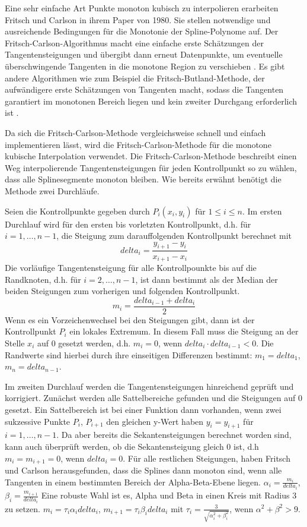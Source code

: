 Eine sehr einfache Art Punkte monoton kubisch zu interpolieren erarbeiten Fritsch und Carlson in ihrem Paper von 1980. Sie stellen notwendige und ausreichende Bedingungen für die Monotonie der Spline-Polynome auf. Der Fritsch-Carlson-Algorithmus macht eine einfache erste Schätzungen der Tangentensteigungen und übergibt dann erneut Datenpunkte, um eventuelle überschwingende Tangenten in die monotone Region zu verschieben \cite{Fritschcarlson:1980}. Es gibt andere Algorithmen wie zum Beispiel die Fritsch-Butland-Methode, der aufwändigere erste Schätzungen von Tangenten macht, sodass die Tangenten garantiert im monotonen Bereich liegen und kein zweiter Durchgang erforderlich ist \cite{Fritschbutland:1984}.

Da sich die Fritsch-Carlson-Methode vergleichsweise schnell und einfach implementieren lässt, wird die Fritsch-Carlson-Methode für die monotone kubische Interpolation verwendet. Die Fritsch-Carlson-Methode beschreibt einen Weg interpolierende Tangentensteigungen für jeden Kontrollpunkt so zu wählen, dass alle Splinesegmente monoton bleiben. Wie bereits erwähnt benötigt die Methode zwei Durchläufe. 

Seien die Kontrollpunkte gegeben durch $P_i(x_i,y_i)$ für $1\le i \le n$.
Im ersten Durchlauf wird für den ersten bis vorletzten Kontrollpunkt, d.h. für $i=1,\dots,n-1$, die Steigung zum darauffolgenden Kontrollpunkt berechnet mit 
$$delta_i=\frac{y_{i+1}-y_i}{x_{i+1}-x_i}$$
Die vorläufige Tangentensteigung für alle Kontrollpounkte bis auf die Randknoten, d.h. für $i=2,\dots,n-1$, ist dann bestimmt als der Median der beiden Steigungen zum vorherigen und folgenden Kontrollpunkt.
$$m_i=\frac{delta_{i-1}+delta_i}{2}$$
Wenn es ein Vorzeichenwechsel bei den Steigungen gibt, dann ist der Kontrollpunkt $P_i$ ein lokales Extremum. In diesem Fall muss die Steigung an der Stelle $x_i$ auf $0$ gesetzt werden, d.h.
$m_i=0$, wenn $delta_i\cdot delta_{i-1} < 0$.
Die Randwerte sind hierbei durch ihre einseitigen Differenzen bestimmt:
$m_1=delta_1$, $m_{n}=delta_{n-1}$.

Im zweiten Durchlauf werden die Tangentensteigungen hinreichend geprüft und korrigiert. Zunächst werden alle Sattelbereiche gefunden und die Steigungen auf $0$ gesetzt. Ein Sattelbereich ist bei einer Funktion dann vorhanden, wenn zwei sukzessive Punkte $P_i$, $P_{i+1}$ den gleichen y-Wert haben $y_i=y_{i+1}$ für $i=1,\dots,n-1$. Da aber bereits die Sekantensteigungen berechnet worden sind, kann auch überprüft werden, ob die Sekantensteigung gleich $0$ ist, d.h
$m_i=m_{i+1}=0$, wenn $delta_i=0$. Für alle restlichen Steigungen, haben
Fritsch und Carlson herausgefunden, dass die Splines dann monoton sind, wenn alle Tangenten in einem bestimmten Bereich der Alpha-Beta-Ebene liegen. 
$\alpha_i =\frac{m_i}{delta_i}$, $\beta_i =\frac{m_{i+1}}{delta_i}$
Eine robuste Wahl ist es, Alpha und Beta in einen Kreis mit Radius 3 zu setzen.
$m_i=\tau_i\alpha_i delta_i$, $m_{i+1}=\tau_i\beta_i delta_i$ mit $\tau_i=\frac{3}{\sqrt{\alpha_i^2+\beta_i^2}}$, wenn $\alpha^2+\beta^2>9$. \cite{Fritschcarlson:1980}

